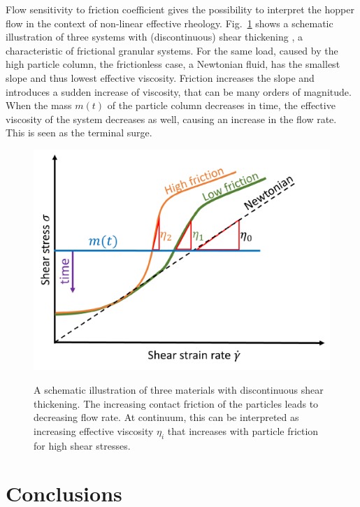 \documentclass[twoside,twocolumn,9pt]{article}
\begin{document}
{Flow sensitivity to friction coefficient gives}
the possibility to interpret the hopper flow in the context of non-linear effective rheology.
{Fig.~\ref{fig:DST} shows a schematic illustration of three systems with (discontinuous) shear thickening \cite{Peters2016}, a characteristic of frictional granular systems. For the same load, caused by the high particle column, the frictionless case, a Newtonian fluid, has the smallest slope and thus lowest effective viscosity. Friction increases the slope and introduces a sudden increase of viscosity, that can be many orders of magnitude.
When the mass $m(t)$ of the particle column decreases in time, the effective viscosity of the system decreases as well, causing an increase in the flow rate. This is seen as the terminal surge. }
%
\begin{figure}[!t] %
 \includegraphics[width=\columnwidth]{fig10-rheology_schematic.pdf}\\
 \caption{A schematic illustration of three materials with discontinuous shear thickening. The increasing contact friction of the particles leads to decreasing flow rate. At continuum, this can be interpreted as increasing effective viscosity $\eta_{i}$ that increases with particle friction for high shear stresses.}\label{fig:DST}
\end{figure}




\section{Conclusions}
\end{document}
